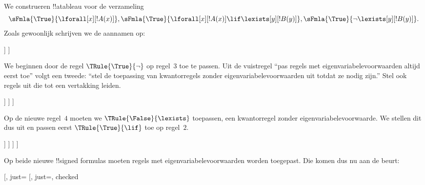 \documentclass[../../../include/open-logic-section]{subfiles}
\begin{document}
\begin{ex}
We construeren !!a{tableau} voor de verzameling
\[
\sFmla{\True}{\lforall[x][!A(x)]}, \sFmla{\True}{\lforall[x][!A(x)] 
  \lif \lexists[y][!B(y)]}, \sFmla{\True}{\lnot\lexists[y][!B(y)]}.
\]
Zoals gewoonlijk schrijven we de aannamen op:
\begin{oltableau}
  [\sFmla{\True}{\lforall[x][\formula{A}(x)]}, just=\TAss
    [\sFmla{\True}{\lforall[x][\formula{A}(x)] \lif
        \lexists[y][\formula{B}(y)]}, just=\TAss
      [\sFmla{\True}{\lnot\lexists[y][\formula{B}(y)]}, just=\TAss
      ]
    ]
  ]
\end{oltableau}
We beginnen door de regel $\TRule{\True}{\lnot}$ op regel~$3$ toe te
passen. Uit de vuistregel ``pas regels met eigenvariabelevoorwaarden
altijd eerst toe'' volgt een tweede: ``stel de toepassing van
kwantorregels zonder eigenvariabelevoorwaarden uit totdat ze nodig
zijn.'' Stel ook regels uit die tot een vertakking leiden.
\begin{oltableau}
  [\sFmla{\True}{\lforall[x][\formula{A}(x)]}, just=\TAss
    [\sFmla{\True}{\lforall[x][\formula{A}(x)] \lif
        \lexists[y][\formula{B}(y)]}, just=\TAss
      [\sFmla{\True}{\lnot\lexists[y][\formula{B}(y)]}, just=\TAss, checked
        [\sFmla{\False}{\lexists[y][\formula{B}(y)]}, just={\TRule{\True}{\lnot}[3]}]
      ]
    ]
  ]
\end{oltableau}
Op de nieuwe regel~$4$ moeten we $\TRule{\False}{\lexists}$ toepassen,
een kwantorregel zonder eigenvariabelevoorwaarde. We stellen dit dus uit
en passen eerst $\TRule{\True}{\lif}$ toe op regel~$2$.
\begin{oltableau}
  [\sFmla{\True}{\lforall[x][\formula{A}(x)]}, just=\TAss
    [\sFmla{\True}{\lforall[x][\formula{A}(x)] \lif
        \lexists[y][\formula{B}(y)]}, just=\TAss, checked
      [\sFmla{\True}{\lnot\lexists[y][\formula{B}(y)]}, just=\TAss, checked
        [\sFmla{\False}{\lexists[y][\formula{B}(y)]},
          just={\TRule{\True}{\lnot}[3]},
          [\sFmla{\False}{\lforall[x][\formula{A}(x)]}, just={\TRule{\True}{\lif}[2]}]
          [\sFmla{\True}{\lexists[y][\formula{B}(y)]}, just={\TRule{\True}{\lif}[2]}]
        ]
      ]
    ]
  ]
\end{oltableau}
Op beide nieuwe !!{signed formula}s moeten regels met
eigenvariabelevoorwaarden worden toegepast. Die komen dus nu aan de
beurt:
\begin{oltableau}
  [\sFmla{\True}{\lforall[x][\formula{A}(x)]}, just=\TAss
    [\sFmla{\True}{\lforall[x][\formula{A}(x)] \lif
        \lexists[y][\formula{B}(y)]}, just=\TAss, checked

\end{oltableau}
\end{ex}
\end{document}
